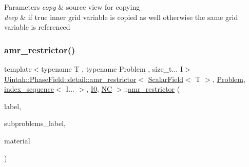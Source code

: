 \begin{DoxyParams}{Parameters}
{\em copy} & source view for copying \\
\hline
{\em deep} & if true inner grid variable is copied as well otherwise the same grid variable is referenced \\
\hline
\end{DoxyParams}
\mbox{\label{classUintah_1_1PhaseField_1_1detail_1_1amr__restrictor_3_01ScalarField_3_01T_01_4_00_01Problem_05760ee5d1d3adcc969b3f56f71e72acb_adc68b10aa0ea3669167e75e848315f69}} 
\subsubsection{\texorpdfstring{amr\+\_\+restrictor()}{amr\_restrictor()}\hspace{0.1cm}{\footnotesize\ttfamily [2/4]}}
{\footnotesize\ttfamily template$<$typename T , typename Problem , size\+\_\+t... I$>$ \\
\hyperlink{classUintah_1_1PhaseField_1_1detail_1_1amr__restrictor}{Uintah\+::\+Phase\+Field\+::detail\+::amr\+\_\+restrictor}$<$ \hyperlink{structUintah_1_1PhaseField_1_1ScalarField}{Scalar\+Field}$<$ T $>$, \hyperlink{classUintah_1_1PhaseField_1_1Problem}{Problem}, \hyperlink{namespaceUintah_1_1PhaseField_a237de804d99512e50613aff7c94a9461}{index\+\_\+sequence}$<$ I... $>$, \hyperlink{namespaceUintah_1_1PhaseField_a547ce3002aa97fbd3ef3192a6eec8406abdd8ebcbdfd71d1125937e3012dc45fb}{I0}, \hyperlink{namespaceUintah_1_1PhaseField_a33d355affda78a83f45755ba8388cedda77924170fe82bfd58b74ca3e44139718}{NC} $>$\+::\hyperlink{classUintah_1_1PhaseField_1_1detail_1_1amr__restrictor}{amr\+\_\+restrictor} (\begin{DoxyParamCaption}\item[{const Var\+Label $\ast$}]{label,  }\item[{const Var\+Label $\ast$}]{subproblems\+\_\+label,  }\item[{int}]{material }\end{DoxyParamCaption})\hspace{0.3cm}{\ttfamily [inline]}}



